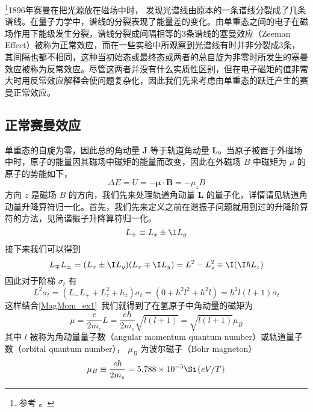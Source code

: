 

\footnote{参考 \cite{GriffQ}。}1896年赛曼在把光源放在磁场中时， 发现光谱线由原本的一条谱线分裂成了几条谱线。在量子力学中，谱线的分裂表现了能量差的变化。由单重态之间的电子在磁场作用下能级发生分裂，谱线分裂成间隔相等的3条谱线的塞曼效应（Zeeman Effect）被称为正常效应，而在一些实验中所观察到光谱线有时并非分裂成3条，其间隔也都不相同，这种当初始态或最终态或两者的总自旋为非零时所发生的塞曼效应被称为反常效应。尽管这两者并没有什么实质性区别，但在电子磁矩的值非常大时用反常效应解释会使问题复杂化，因此我们先来考虑由单重态的跃迁产生的赛曼正常效应。

\subsection{正常赛曼效应}
单重态的自旋为零，因此总的角动量 $\mathbf{J}$ 等于轨道角动量 $\mathbf{L}$。当原子被置于外磁场中时，原子的能量因其磁场中磁矩的能量而改变，因此在外磁场 $B$ 中磁矩为 $\mu$ 的原子的势能如下，
\begin{equation}
\Delta E=U = -\boldsymbol\mu\cdot \mathbf{B}=-\mu_z B
\end{equation}
方向 $z$ 是磁场 $B$ 的方向，我们先来处理轨道角动量 $\mathbf{L}$ 的量子化，详情请见轨道角动量升降算符归一化。首先，我们先来定义之前在谐振子问题就用到过的升降阶算符的方法，见简谐振子升降算符归一化。
\begin{equation}
L_{\pm}\equiv L_x \pm \I L_y
\end{equation}
接下来我们可以得到
\begin{equation}
L_{\mp}L_{\pm}=(L_x \pm \I L_y)(L_x \mp \I L_y)=L^2-L_z^2\mp \I(\I\hbar L_z)
\end{equation}
因此对于阶梯 $\sigma_t$ 有
\begin{equation}
L^2\sigma_t=(L_{-}L_{+}+L^2_z+\hbar_z)\sigma_t=(0+\hbar^2l^2+\hbar^2l)=\hbar^2l(l+1)\sigma_t
\end{equation}
这样结合\autoref{MagMom_ex1}~我们就得到了在氢原子中角动量的磁矩为
$$\mu=\frac{e}{2m_e}L=\frac{e\hbar}{2m_e}\sqrt{l(l+1)}=\sqrt{l(l+1)}\mu_B$$
其中 $l$ 被称为角动量量子数（angular momentum quantum number）或轨道量子数（orbital quantum number）， $\mu_B$ 为波尔磁子（Bohr magneton）
\begin{equation}
\mu_B\equiv\frac{e\hbar}{2m_e}=5.788\times 10^{-5}\Si{eV/T}
\end{equation}
